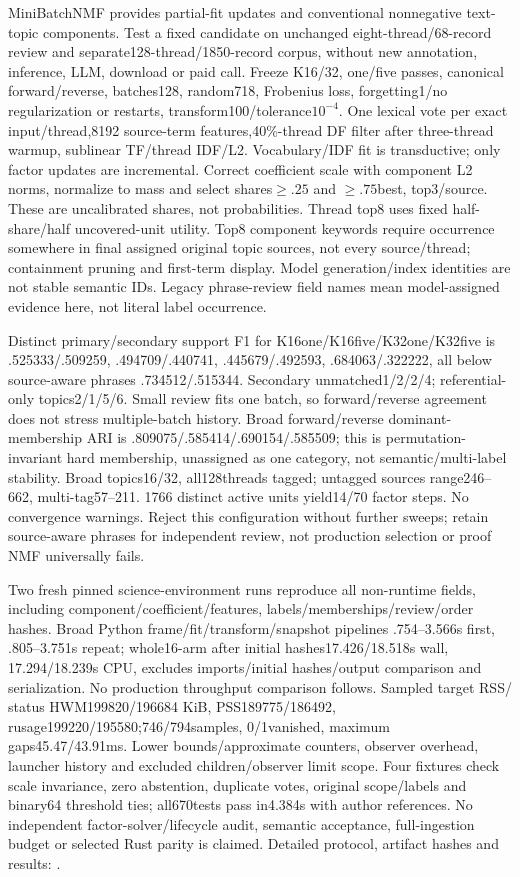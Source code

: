 \documentclass[11pt]{article}
\begin{document}
MiniBatchNMF provides partial-fit updates and conventional nonnegative text-topic
components\cite{sklearnnmf,sklearnnmftext}. Test a fixed candidate on unchanged
eight-thread/68-record review and separate128-thread/1850-record corpus, without
new annotation, inference, LLM, download or paid call. Freeze K16/32, one/five
passes, canonical forward/reverse, batches128, random718, Frobenius loss,
forgetting1/no regularization or restarts, transform100/tolerance$10^{-4}$.
One lexical vote per exact input/thread,8192 source-term features,40\%-thread
DF filter after three-thread warmup, sublinear TF/thread IDF/L2. Vocabulary/IDF
fit is transductive; only factor updates are incremental. Correct coefficient
scale with component L2 norms, normalize to mass and select shares$\geq.25$ and
$\geq.75$best, top3/source. These are uncalibrated shares, not probabilities.
Thread top8 uses fixed half-share/half uncovered-unit utility. Top8 component
keywords require occurrence somewhere in final assigned original topic sources,
not every source/thread; containment pruning and first-term display. Model
generation/index identities are not stable semantic IDs. Legacy phrase-review
field names mean model-assigned evidence here, not literal label occurrence.

Distinct primary/secondary support F1 for K16one/K16five/K32one/K32five is
.525333/.509259, .494709/.440741, .445679/.492593, .684063/.322222, all below
source-aware phrases .734512/.515344. Secondary unmatched1/2/2/4; referential-only
topics2/1/5/6. Small review fits one batch, so forward/reverse agreement does not
stress multiple-batch history. Broad forward/reverse dominant-membership ARI is
.809075/.585414/.690154/.585509; this is permutation-invariant hard membership,
unassigned as one category, not semantic/multi-label stability. Broad topics16/32,
all128threads tagged; untagged sources range246--662, multi-tag57--211.
1766 distinct active units yield14/70 factor steps. No convergence warnings.
Reject this configuration without further sweeps; retain source-aware phrases
for independent review, not production selection or proof NMF universally fails.

Two fresh pinned science-environment runs reproduce all non-runtime fields,
including component/coefficient/features, labels/memberships/review/order hashes.
Broad Python frame/fit/transform/snapshot pipelines .754--3.566s first,
.805--3.751s repeat; whole16-arm after initial hashes17.426/18.518s wall,
17.294/18.239s CPU, excludes imports/initial hashes/output comparison and
serialization. No production throughput comparison follows. Sampled target RSS/
status HWM199820/196684 KiB, PSS189775/186492, rusage199220/195580;746/794samples,
0/1vanished, maximum gaps45.47/43.91ms. Lower bounds/approximate counters,
observer overhead, launcher history and excluded children/observer limit scope.
Four fixtures check scale invariance, zero abstention, duplicate votes, original
scope/labels and binary64 threshold ties; all670tests pass in4.384s with author
references. No independent factor-solver/lifecycle audit, semantic acceptance,
full-ingestion budget or selected Rust parity is claimed. Detailed protocol,
artifact hashes and results: .
\end{document}
